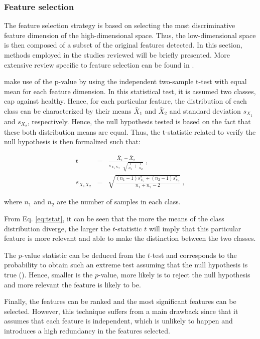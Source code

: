 \subsubsection{Feature selection}\label{subsubsec:featsel}

The feature selection strategy is based on selecting the most discriminative feature dimension of the high-dimensional space. Thus, the low-dimensional space is then composed of a subset of the original features detected. In this section, methods employed in the studies reviewed will be briefly presented. More extensive review specific to feature selection can be found in \cite{Saeys2007}.

\cite{Niaf2011,Niaf2012} make use of the p-value by using the independent two-sample t-test with equal mean for each feature dimension. In this statistical test, it is assumed two classes, \ac{cap} against healthy. Hence, for each particular feature, the distribution of each class can be characterized by their means $\bar{X}_1$ and $\bar{X}_2$ and standard deviation $s_{X_1}$ and $s_{X_2}$, respectively. Hence, the null hypothesis tested is based on the fact that these both distribution means are equal. Thus, the t-statistic related to verify the null hypothesis is then formalized such that:

\begin{eqnarray}
t & = & \frac{\bar {X}_1 - \bar{X}_2}{s_{X_1X_2} \cdot \sqrt{\frac{1}{n_1}+\frac{1}{n_2}}} \ , \label{eq:tstat} \\
s_{X_1X_2} & = & \sqrt{\frac{(n_1-1)s_{X_1}^2+(n_2-1)s_{X_2}^2}{n_1+n_2-2}} \ , \nonumber
\end{eqnarray}

\noindent where $n_1$ and $n_2$ are the number of samples in each class.

From Eq. \eqref{eq:tstat}, it can be seen that the more the means of the class distribution diverge, the larger the $t$-statistic $t$ will imply that this particular feature is more relevant and able to make the distinction between the two classes. 

The $p$-value statistic can be deduced from the $t$-test and corresponds to the probability to obtain such an extreme test assuming that the null hypothesis is true (\cite{Goodman1999}). Hence, smaller is the $p$-value, more likely is to reject the null hypothesis and more relevant the feature is likely to be.

Finally, the features can be ranked and the most significant features can be selected. However, this technique suffers from a main drawback since that it assumes that each feature is independent, which is unlikely to happen and introduces a high redundancy in the features selected.

